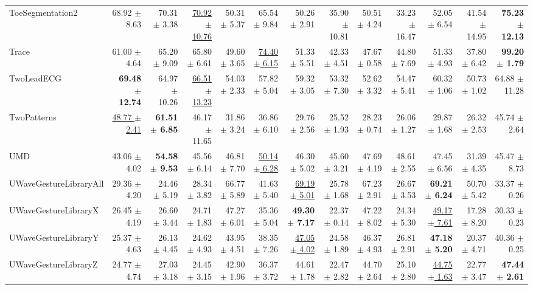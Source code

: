 \begin{landscape}
\begin{longtable}{lrrrrrrrrrrrr}
ToeSegmentation2 & 68.92 $\pm$ 8.63 & 70.31 $\pm$ 3.38 & \underline{70.92 $\pm$ 10.76} & 50.31 $\pm$ 5.37 & 65.54 $\pm$ 9.84 & 50.26 $\pm$ 2.91 & 35.90 $\pm$ 10.81 & 50.51 $\pm$ 4.24 & 33.23 $\pm$ 16.47 & 52.05 $\pm$ 6.54 & 41.54 $\pm$ 14.95 & \textbf{75.23 $\pm$ 12.13} \\
Trace & 61.00 $\pm$ 4.64 & 65.20 $\pm$ 9.09 & 65.80 $\pm$ 6.61 & 49.60 $\pm$ 3.65 & \underline{74.40 $\pm$ 6.15} & 51.33 $\pm$ 5.51 & 42.33 $\pm$ 4.51 & 47.67 $\pm$ 0.58 & 44.80 $\pm$ 7.69 & 51.33 $\pm$ 4.93 & 37.80 $\pm$ 6.42 & \textbf{99.20 $\pm$ 1.79} \\
TwoLeadECG & \textbf{69.48 $\pm$ 12.74} & 64.97 $\pm$ 10.26 & \underline{66.51 $\pm$ 13.23} & 54.03 $\pm$ 2.33 & 57.82 $\pm$ 5.04 & 59.32 $\pm$ 3.05 & 53.32 $\pm$ 7.30 & 52.62 $\pm$ 3.32 & 54.47 $\pm$ 5.41 & 60.32 $\pm$ 1.06 & 50.73 $\pm$ 1.02 & 64.88 $\pm$ 11.28 \\
TwoPatterns & \underline{48.77 $\pm$ 2.41} & \textbf{61.51 $\pm$ 6.85} & 46.17 $\pm$ 11.65 & 31.86 $\pm$ 3.24 & 36.86 $\pm$ 6.10 & 29.76 $\pm$ 2.56 & 25.52 $\pm$ 1.93 & 28.23 $\pm$ 0.74 & 26.06 $\pm$ 1.27 & 29.87 $\pm$ 1.68 & 26.32 $\pm$ 2.53 & 45.74 $\pm$ 2.64 \\
UMD & 43.06 $\pm$ 4.02 & \textbf{54.58 $\pm$ 9.53} & 45.56 $\pm$ 6.14 & 46.81 $\pm$ 7.70 & \underline{50.14 $\pm$ 6.28} & 46.30 $\pm$ 5.02 & 45.60 $\pm$ 3.21 & 47.69 $\pm$ 4.19 & 48.61 $\pm$ 2.55 & 47.45 $\pm$ 6.56 & 31.39 $\pm$ 4.35 & 45.47 $\pm$ 8.73 \\
UWaveGestureLibraryAll & 29.36 $\pm$ 4.20 & 24.46 $\pm$ 5.19 & 28.34 $\pm$ 3.82 & 66.77 $\pm$ 5.89 & 41.63 $\pm$ 5.40 & \underline{69.19 $\pm$ 5.01} & 25.78 $\pm$ 1.68 & 67.23 $\pm$ 2.91 & 26.67 $\pm$ 3.53 & \textbf{69.21 $\pm$ 6.24} & 50.70 $\pm$ 5.42 & 33.37 $\pm$ 0.26 \\
UWaveGestureLibraryX & 26.45 $\pm$ 4.19 & 26.60 $\pm$ 3.44 & 24.71 $\pm$ 1.83 & 47.27 $\pm$ 6.01 & 35.36 $\pm$ 5.04 & \textbf{49.30 $\pm$ 7.17} & 22.37 $\pm$ 0.14 & 47.22 $\pm$ 8.02 & 24.34 $\pm$ 5.30 & \underline{49.17 $\pm$ 7.61} & 17.28 $\pm$ 8.20 & 30.33 $\pm$ 0.23 \\
UWaveGestureLibraryY & 25.37 $\pm$ 4.63 & 26.13 $\pm$ 4.45 & 24.62 $\pm$ 4.93 & 43.95 $\pm$ 4.51 & 38.35 $\pm$ 7.26 & \underline{47.05 $\pm$ 4.02} & 24.58 $\pm$ 1.89 & 46.37 $\pm$ 4.93 & 26.81 $\pm$ 2.91 & \textbf{47.18 $\pm$ 5.20} & 20.37 $\pm$ 4.71 & 40.36 $\pm$ 0.25 \\
UWaveGestureLibraryZ & 24.77 $\pm$ 4.74 & 27.03 $\pm$ 3.18 & 24.45 $\pm$ 3.15 & 42.90 $\pm$ 1.96 & 36.37 $\pm$ 3.72 & 44.61 $\pm$ 1.78 & 22.47 $\pm$ 2.82 & 44.70 $\pm$ 2.64 & 25.10 $\pm$ 2.80 & \underline{44.75 $\pm$ 1.63} & 22.77 $\pm$ 3.47 & \textbf{47.44 $\pm$ 2.61} \\

\end{longtable}
\end{landscape}
